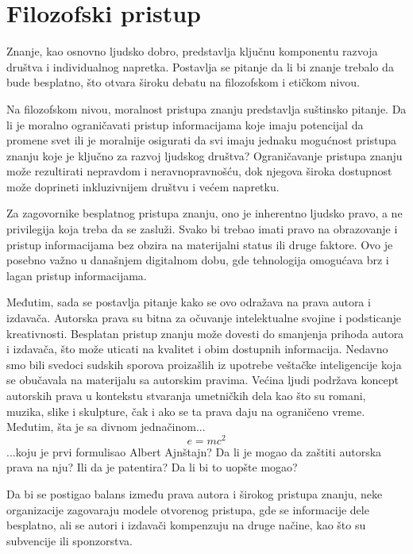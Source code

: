 \documentclass{article}
\begin{document}

\section{Filozofski pristup}

Znanje, kao osnovno ljudsko dobro, predstavlja ključnu komponentu razvoja društva i individualnog napretka. Postavlja se pitanje da li bi znanje trebalo da bude besplatno, što otvara široku debatu na filozofskom i etičkom nivou.

Na filozofskom nivou, moralnost pristupa znanju predstavlja suštinsko pitanje. Da li je moralno ograničavati pristup informacijama koje imaju potencijal da promene svet ili je moralnije osigurati da svi imaju jednaku mogućnost pristupa znanju koje je ključno za razvoj ljudskog društva? Ograničavanje pristupa znanju može rezultirati nepravdom i neravnopravnošću, dok njegova široka dostupnost može doprineti inkluzivnijem društvu i većem napretku. 

Za zagovornike besplatnog pristupa znanju, ono je inherentno ljudsko pravo, a ne privilegija koja treba da se zasluži. Svako bi trebao imati pravo na obrazovanje i pristup informacijama bez obzira na materijalni status ili druge faktore. Ovo je posebno važno u današnjem digitalnom dobu, gde tehnologija omogućava brz i lagan pristup informacijama. 

Međutim, sada se postavlja pitanje kako se ovo odražava na prava autora i izdavača. Autorska prava su bitna za očuvanje intelektualne svojine i podsticanje kreativnosti. Besplatan pristup znanju može dovesti do smanjenja prihoda autora i izdavača, što može uticati na kvalitet i obim dostupnih informacija. Nedavno smo bili svedoci sudskih sporova proizašlih iz upotrebe veštačke inteligencije koja se obučavala na materijalu sa autorskim pravima. Većina ljudi podržava koncept autorskih prava u kontekstu stvaranja umetničkih dela kao što su romani, muzika, slike i skulpture, čak i ako se ta prava daju na ograničeno vreme. Međutim, šta je sa divnom jednačinom...
\begin{equation*}
e = mc^2
\end{equation*}
...koju je prvi formulisao Albert Ajnštajn? Da li je mogao da zaštiti autorska prava na nju? Ili da je patentira? Da li bi to uopšte mogao?

Da bi se postigao balans između prava autora i širokog pristupa znanju, neke organizacije zagovaraju modele otvorenog pristupa, gde se informacije dele besplatno, ali se autori i izdavači kompenzuju na druge načine, kao što su subvencije ili sponzorstva. 
\end{document}
